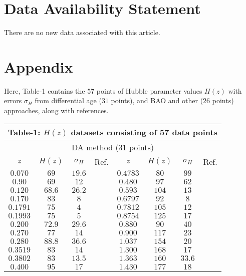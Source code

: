 \section{Data Availability Statement}
There are no new data associated with this article.

\section{Appendix}
Here, Table-1 contains the $57$ points of Hubble parameter values $H(z)$ with errors $\sigma _{H}$ from differential age ($31$ points), and BAO and other ($26$ points) approaches, along with references.

\begin{center}
\begin{tabular}{|c|c|c|c|c|c|c|c|}\hline
\multicolumn{8}{|c|}{Table-1: $H(z)$ datasets consisting of 57 data points} \\ \hline
\multicolumn{8}{|c|}{DA method (31 points)}  \\ \hline
$z$ & $H(z)$ & $\sigma _{H}$ & Ref. & $z$ & $H(z)$ & $\sigma _{H}$ & Ref. \\ \hline
$0.070$ & $69$ & $19.6$ & \cite{h1} & $0.4783$ & $80$ & $99$ & \cite{h5} \\ \hline
$0.90$ & $69$ & $12$ & \cite{h2} & $0.480$ & $97$ & $62$ & \cite{h1} \\ \hline
$0.120$ & $68.6$ & $26.2$ & \cite{h1} & $0.593$ & $104$ & $13$ & \cite{h3} \\ \hline
$0.170$ & $83$ & $8$ & \cite{h2} & $0.6797$ & $92$ & $8$ & \cite{h3} \\ \hline
$0.1791$ & $75$ & $4$ & \cite{h3} & $0.7812$ & $105$ & $12$ & \cite{h3} \\ \hline
$0.1993$ & $75$ & $5$ & \cite{h3} & $0.8754$ & $125$ & $17$ & \cite{h3} \\ \hline
$0.200$ & $72.9$ & $29.6$ & \cite{h4} & $0.880$ & $90$ & $40$ & \cite{h1} \\ \hline
$0.270$ & $77$ & $14$ & \cite{h2} & $0.900$ & $117$ & $23$ & \cite{h2} \\ \hline 
$0.280$ & $88.8$ & $36.6$ & \cite{h4} & $1.037$ & $154$ & $20$ & \cite{h3} \\ \hline 
$0.3519$ & $83$ & $14$ & \cite{h3} & $1.300$ & $168$ & $17$ & \cite{h2} \\ \hline 
$0.3802$ & $83$ & $13.5$ & \cite{h5} & $1.363$ & $160$ & $33.6$ & \cite{h7} \\ \hline 
$0.400$ & $95$ & $17$ & \cite{h2} & $1.430$ & $177$ & $18$ & \cite{h2} \\ \hline 

\end{tabular}
\end{center}
